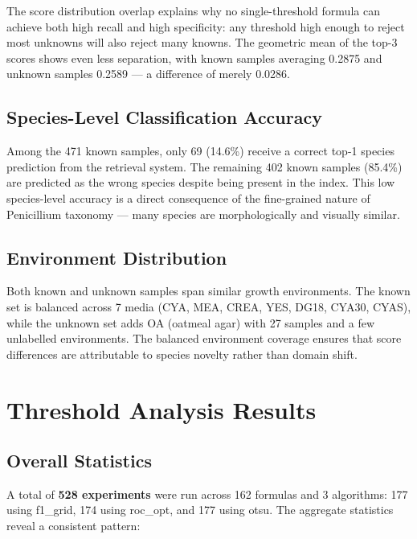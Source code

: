 \documentclass[11pt,a4paper]{article}
\newcommand{\algo}[1]{\textsf{#1}}
\begin{document}
\noindent The score distribution overlap explains why no single-threshold formula can achieve both high recall and high specificity: any threshold high enough to reject most unknowns will also reject many knowns. The geometric mean of the top-3 scores shows even less separation, with known samples averaging 0.2875 and unknown samples 0.2589 --- a difference of merely 0.0286.

\subsection{Species-Level Classification Accuracy}

Among the 471 known samples, only 69 (14.6\%) receive a correct top-1 species prediction from the retrieval system. The remaining 402 known samples (85.4\%) are predicted as the wrong species despite being present in the index. This low species-level accuracy is a direct consequence of the fine-grained nature of Penicillium taxonomy --- many species are morphologically and visually similar.

\subsection{Environment Distribution}

Both known and unknown samples span similar growth environments. The known set is balanced across 7 media (CYA, MEA, CREA, YES, DG18, CYA30, CYAS), while the unknown set adds OA (oatmeal agar) with 27 samples and a few unlabelled environments. The balanced environment coverage ensures that score differences are attributable to species novelty rather than domain shift.


\section{Threshold Analysis Results}

\subsection{Overall Statistics}

A total of \textbf{528 experiments} were run across 162 formulas and 3 algorithms: 177 using \algo{f1\_grid}, 174 using \algo{roc\_opt}, and 177 using \algo{otsu}. The aggregate statistics reveal a consistent pattern:
\end{document}

